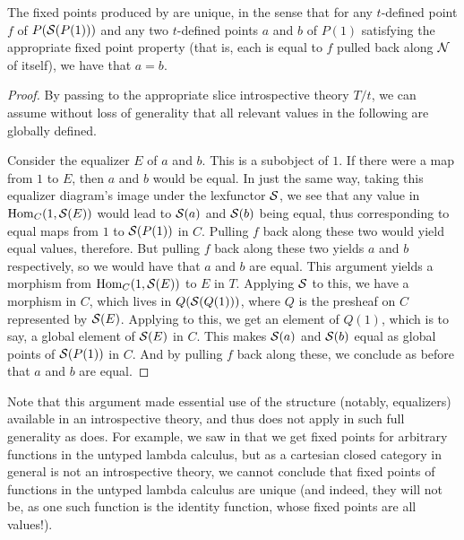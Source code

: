 \begin{theorem}\label{UniqueFixedPoints}
The fixed points produced by  are unique, in the sense that for any $t$-defined point $f$ of $P(\mathcal{S}(P(1)))$ and any two $t$-defined points $a$ and $b$ of $P(1)$ satisfying the appropriate fixed point property (that is, each is equal to $f$ pulled back along $\mathcal{N}$ of itself), we have that $a = b$.
\end{theorem}
\begin{proof}
By passing to the appropriate slice introspective theory $T/t$, we can assume without loss of generality that all relevant values in the following are globally defined. 

Consider the equalizer $E$ of $a$ and $b$. This is a subobject of $1$. If there were a map from $1$ to $E$, then $a$ and $b$ would be equal. In just the same way, taking this equalizer diagram's image under the lexfunctor $\mathcal{S}$, we see that any value in $\operatorname{Hom}_C(1, \mathcal{S}(E))$ would lead to $\mathcal{S}(a)$ and $\mathcal{S}(b)$ being equal, thus corresponding to equal maps from $1$ to $\mathcal{S}(P(1))$ in $C$. Pulling $f$ back along these two would yield equal values, therefore. But pulling $f$ back along these two yields $a$ and $b$ respectively, so we would have that $a$ and $b$ are equal. This argument yields a morphism from $\operatorname{Hom}_C(1, \mathcal{S}(E))$ to $E$ in $T$. Applying $\mathcal{S}$ to this, we have a morphism in $C$, which lives in $Q(\mathcal{S}(Q(1)))$, where $Q$ is the presheaf on $C$ represented by $\mathcal{S}(E)$. Applying  to this, we get an element of $Q(1)$, which is to say, a global element of $\mathcal{S}(E)$ in $C$. This makes $\mathcal{S}(a)$ and $\mathcal{S}(b)$ equal as global points of $\mathcal{S}(P(1))$ in $C$. And by pulling $f$ back along these, we conclude as before that $a$ and $b$ are equal. 
\end{proof}

\begin{observation}
Note that this argument made essential use of the structure (notably, equalizers) available in an introspective theory, and thus does not apply in such full generality as  does. For example, we saw in  that we get fixed points for arbitrary functions in the untyped lambda calculus, but as a cartesian closed category in general is not an introspective theory, we cannot conclude that fixed points of functions in the untyped lambda calculus are unique (and indeed, they will not be, as one such function is the identity function, whose fixed points are all values!).
\end{observation}

